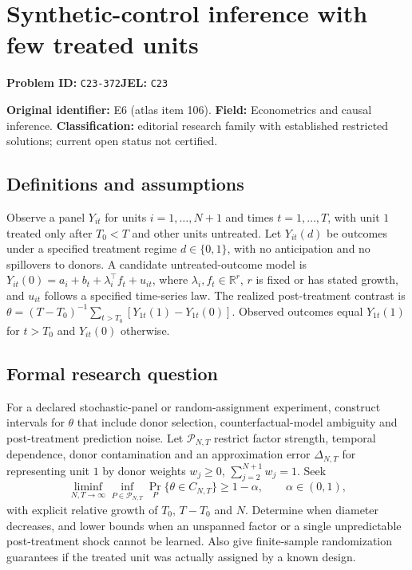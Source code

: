 \documentclass[11pt,a4paper]{article}
\begin{document}
\section*{Synthetic-control inference with few treated units}
\textbf{Problem ID:} \texttt{C23-372}\quad \textbf{JEL:} \texttt{C23}\par
\label{problem:OP-0106}
\label{atlas:prob:E6}

\noindent\textbf{Original identifier:} E6 (atlas item 106). \textbf{Field:} Econometrics and causal inference. \textbf{Classification:} editorial research family with established restricted solutions; current open status not certified.

\subsection*{Definitions and assumptions}

Observe a panel $Y_{it}$ for units $i=1,\ldots,N+1$ and times $t=1,\ldots,T$, with unit $1$ treated only after $T_0<T$ and other units untreated. Let $Y_{it}(d)$ be outcomes under a specified treatment regime $d\in\{0,1\}$, with no anticipation and no spillovers to donors. A candidate untreated-outcome model is $Y_{it}(0)=a_i+b_t+\lambda_i^\top f_t+u_{it}$, where $\lambda_i,f_t\in\mathbb R^r$, $r$ is fixed or has stated growth, and $u_{it}$ follows a specified time-series law. The realized post-treatment contrast is $\theta=(T-T_0)^{-1}\sum_{t>T_0}[Y_{1t}(1)-Y_{1t}(0)]$. Observed outcomes equal $Y_{1t}(1)$ for $t>T_0$ and $Y_{it}(0)$ otherwise.

\subsection*{Formal research question}

For a declared stochastic-panel or random-assignment experiment, construct intervals for $\theta$ that include donor selection, counterfactual-model ambiguity and post-treatment prediction noise. Let $\mathcal P_{N,T}$ restrict factor strength, temporal dependence, donor contamination and an approximation error $\Delta_{N,T}$ for representing unit $1$ by donor weights $w_j\ge0$, $\sum_{j=2}^{N+1}w_j=1$. Seek
\[
\liminf_{N,T\to\infty}\inf_{P\in\mathcal P_{N,T}}
\Pr_P\{\theta\in C_{N,T}\}\ge1-\alpha,\qquad\alpha\in(0,1),
\]
with explicit relative growth of $T_0$, $T-T_0$ and $N$. Determine when diameter decreases, and lower bounds when an unspanned factor or a single unpredictable post-treatment shock cannot be learned. Also give finite-sample randomization guarantees if the treated unit was actually assigned by a known design.
\end{document}
